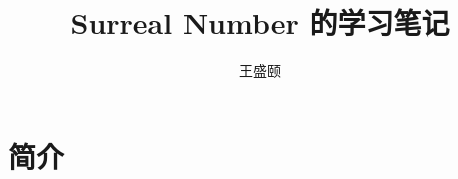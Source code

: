 \documentclass[cs4size,a4paper,adobefonts]{ctexart}
\begin{document}
\title{\bfseries Surreal Number 的学习笔记}
\author{王盛颐}
\date{}
\maketitle
\section{简介}
\end{document}
